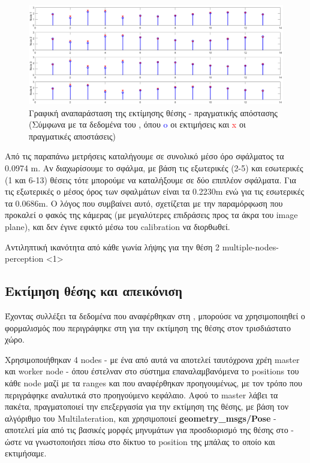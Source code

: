 \begin{figure}[H]
  \centering
  \includegraphics[width=0.9\linewidth]{../Images/Experiments-Results/nodes-estimations.png}
  \decoRule
  \caption[Γραφική αναπαράσταση της εκτίμησης θέσης - πραγματικής απόστασης]{Γραφική αναπαράσταση της εκτίμησης θέσης - πρα\-γμα\-τι\-κής απόστασης (Σύμφωνα με τα δεδομένα του , όπου \textcolor{blue}{o} οι εκτιμήσεις και \textcolor{red}{x} οι πραγματικές αποστάσεις)}
  \label{fig:est-act-dist-figure}
\end{figure}

Από τις παραπάνω μετρήσεις καταλήγουμε σε συνολικό μέσο όρο σφάλματος τα 0.0974 m. Αν διαχωρίσουμε το σφάλμα, με βάση τις εξωτερικές (2-5) και εσωτερικές (1 και 6-13) θέσεις τότε μπορούμε να καταλήξουμε σε δύο επιπλέον σφάλματα. Για τις εξωτερικές ο μέσος όρος των σφαλμάτων είναι τα 0.2230m ενώ για τις εσωτερικές τα 0.0686m. Ο λόγος που συμβαίνει αυτό, σχετίζεται με την παραμόρφωση που προκαλεί ο φακός της κάμερας (με μεγαλύτερες επιδράσεις προς τα άκρα του image plane), και δεν έγινε εφικτό μέσω του calibration να διορθωθεί.

{Αντιληπτική ικανότητα από κάθε γωνία λήψης για την θέση 2}%
{multiple-nodes-perception}%
<1>


\subsection{Εκτίμηση θέσης και απεικόνιση}
Έχοντας συλλέξει τα δεδομένα που αναφέρθηκαν στη , μπορούσε να χρησιμοποιηθεί ο φορμαλισμός που περιγράφηκε στη  για την εκτίμηση της θέσης στον τρισδιάστατο χώρο. 

Χρησιμοποιήθηκαν 4 nodes - με ένα από αυτά να αποτελεί ταυτόχρονα χρέη master και worker node - όπου έστελναν στο σύστημα επαναλαμβανόμενα το positions του κάθε node μαζί με τα ranges και που αναφέρθηκαν προηγουμένως, με τον τρόπο που περιγράφηκε αναλυτικά στο προηγούμενο κεφάλαιο. Αφού το master λάβει τα πακέτα, πραγματοποιεί την επεξεργασία για την εκτίμηση της θέσης, με βάση τον αλγόριθμο του Multilateration, και χρησιμοποιεί \textbf{geometry\_msgs/Pose} - αποτελεί μία από τις βασικές μορφές μηνυμάτων για προσδιορισμό της θέσης στο  - ώστε να γνωστοποιήσει πίσω στο δίκτυο το position της μπάλας το οποίο και εκτιμήσαμε.

